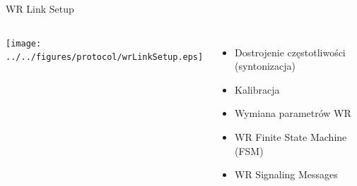 \documentclass[compress,red]{beamer}
\begin{document}
\begin{frame}{WR Link Setup }

  \begin{columns}[c]

      \begin{center}
      \texttt{[image: ../../figures/protocol/wrLinkSetup.eps]}
      \end{center}



      \begin{itemize}
	\item Dostrojenie częstotliwości (syntonizacja)
	\item Kalibracja
	\item Wymiana parametrów WR
	\item WR Finite State Machine (FSM)
	\item WR Signaling Messages
      \end{itemize}

  \end{columns}

\end{frame}
% 
% 
% 
\end{document}
